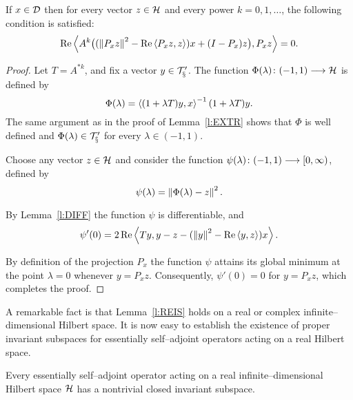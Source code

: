 \medskip

\begin{lem}\label{l:REIS}
If $x\in{\cal{D}}$ then for every vector $z\in{\cal H}$ and every power $k=0,1,\ldots$,
the following condition is satisfied:
\[ \operatorname{Re}\left<A^k\big((\left\Vert P_x z\right\Vert^2 - \operatorname{Re}\left<P_x z,z\right>)x + (I-P_x)z\big),
   P_x z\right> = 0.  \]
\end{lem}

\begin{proof}
Let $T=A^{*k}$, and fix a vector $y\in\cal{T}'_x$. The function
$\Phi(\lambda)\colon(-1,1)\longrightarrow{\cal H}$ is defined by
\[ \Phi(\lambda) = \left<(1+\lambda T)y, x\right>^{-1} (1+\lambda T)y. \]
The same argument as in the proof of Lemma~\ref{l:EXTR} shows that $\Phi$ is
well defined and $\Phi(\lambda)\in\cal{T}'_x$ for every $\lambda\in(-1,1)$.

Choose any vector $z\in{\cal H}$ and consider the function
$\psi(\lambda)\colon(-1,1)\longrightarrow[0,\infty)$, defined by
\[ \psi(\lambda)=\left\Vert\Phi(\lambda) - z\right\Vert^2. \]

By Lemma~\ref{l:DIFF} the function $\psi$ is differentiable, and
\[ \psi'(0) = 2\operatorname{Re}\left<T y, y - z - (\left\Vert y\right\Vert^2-\operatorname{Re}\left<y,z\right>) x\right>. \]

By definition of the projection $P_x$ the function $\psi$ attains its global
minimum at the point $\lambda=0$ whenever $y=P_x z$. Consequently,
$\psi'(0)=0$ for $y=P_x z$, which completes the proof.
\end{proof}

\medskip

A remarkable fact is that Lemma~\ref{l:REIS} holds on a real or complex
infinite--dimensional Hilbert space. It is now easy to establish the
existence of proper invariant subspaces for essentially self--adjoint
operators acting on a real Hilbert space.

\begin{thm}\label{t:ISR}
Every essentially self--adjoint operator acting on a real
infinite--dimensional Hilbert space ${\cal H}$ has a nontrivial closed invariant
subspace.
\end{thm}

